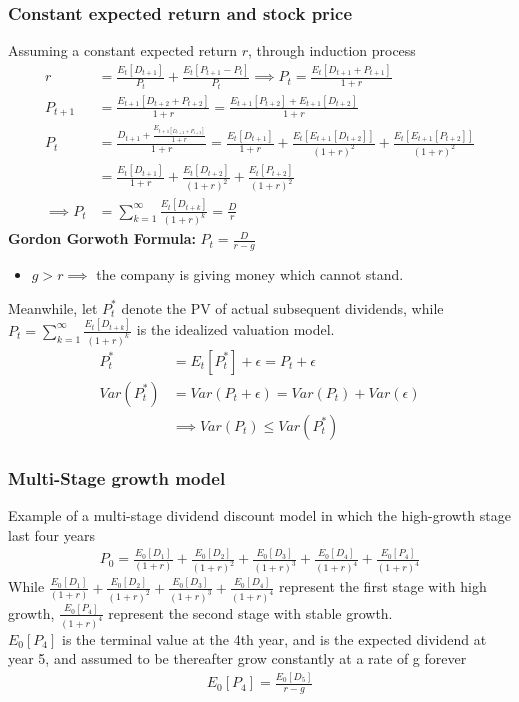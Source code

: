 \documentclass{article}
\theoremstyle{definition}
\theoremstyle{thrm}
\theoremstyle{lma}
\theoremstyle{ppst}
\theoremstyle{crlr}
\begin{document}
\subsubsection{Constant expected return and stock price}
Assuming a constant expected return $r$, through induction process
\begin{align*}
	r&= \frac{E_t[D_{t+1}]}{P_t}+\frac{E_t[P_{t+1}-P_t]}{P_t}\implies P_t = \frac{E_t[D_{t+1}+P_{t+1}]}{1+r}\\
	P_{t+1} &= \frac{E_{t+1}[D_{t+2}+P_{t+2}]}{1+r} = \frac{E_{t+1}[P_{t+2}]+E_{t+1}[D_{t+2}]}{1+r}\\
	P_t &= \frac{D_{t+1}+\frac{E_{t+1[D_{t+2}+P_{t+2}]}}{1+r}}{1+r} = \frac{E_{t}[D_{t+1}]}{1+r}+\frac{E_t[E_{t+1}[D_{t+2}]]}{(1+r)^2} + \frac{E_t[E_{t+1}[P_{t+2}]]}{(1+r)^2}\\
	&=\frac{E_t[D_{t+1}]}{1+r}+\frac{E_t[D_{t+2}]}{(1+r)^2}+\frac{E_t[P_{t+2}]}{(1+r)^2}\\
	\implies P_t &= \sum_{k=1}^\infty \frac{E_t[D_{t+k}]}{(1+r)^k} = \frac{D}{r}
\end{align*}
\textbf{Gordon Gorwoth Formula: }$P_t = \frac{D}{r-g}$
\begin{itemize}
	\item $g>r\implies$ the company is giving money which cannot stand. 
\end{itemize}
Meanwhile, let $P_t^*$ denote the PV of actual subsequent dividends, while $P_t =\sum_{k=1}^\infty \frac{E_t[D_{t+k}]}{(1+r)^k}$ is the idealized valuation model. 
\begin{align*}
	P_t^* &= E_t[P_t^*]+\epsilon = P_t+\epsilon\\
	Var(P_t^*) &= Var(P_t+\epsilon) = Var(P_t)+Var(\epsilon)\\
	&\implies Var(P_t) \leq Var(P_t^*)
\end{align*}

\subsubsection{Multi-Stage growth model}
Example of a multi-stage dividend discount model in which the high-growth stage last four years
\begin{align*}
	P_0 = \frac{E_0[D_1]}{(1+r)}+\frac{E_0[D_2]}{(1+r)^2}+\frac{E_0[D_3]}{(1+r)^3}  +\frac{E_0[D_4]}{(1+r)^4} +\frac{E_0[P_4]}{(1+r)^4}
\end{align*}
While $\frac{E_0[D_1]}{(1+r)}+\frac{E_0[D_2]}{(1+r)^2}+\frac{E_0[D_3]}{(1+r)^3}  +\frac{E_0[D_4]}{(1+r)^4}$ represent the first stage with high growth, $\frac{E_0[P_4]}{(1+r)^4}$ represent the second stage with stable growth. \\
$E_0[P_4]$ is the terminal value at the 4th year, and is the expected dividend at year 5, and assumed to be thereafter grow constantly at a rate of g forever
\begin{align*}
	E_0[P_4] = \frac{E_0[D_5]}{r-g}
\end{align*}
\end{document}
